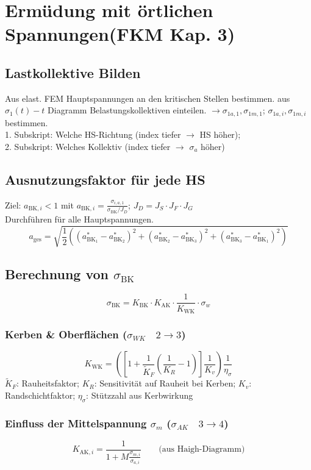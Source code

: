 \vspace{-1mm}
\section{Ermüdung mit örtlichen Spannungen(FKM Kap. 3)}
    \subsection{Lastkollektive Bilden}
    Aus elast. FEM Hauptspannungen an den kritischen Stellen bestimmen.
    aus $\sigma_1(t)-t$ Diagramm Belastungskollektiven einteilen. $\rightarrow \sigma_{1a,1}, \sigma_{1m,1}$; $\sigma_{1a,i}, \sigma_{1m,i}$ bestimmen.
    \\1. Subskript: Welche HS-Richtung (index tiefer $\rightarrow$ HS höher); 
    \\2. Subskript: Welches Kollektiv (index tiefer $\rightarrow$ $\sigma_a$ höher)
    \subsection{Ausnutzungsfaktor für jede HS}
        Ziel: $a_{\textrm{BK},i} < 1$ mit $\displaystyle a_{\textrm{BK},i} = \frac{\sigma_{i,a,1}}{\sigma_{\textrm{BK}}/J_D}$; \quad $J_D=J_S\cdot J_F \cdot J_G$ 
        \\Durchführen für alle Hauptspannungen.
        \[a_{\textrm{ges}}=\sqrt{\frac{1}{2}\left((a_{\textrm{BK}_1}^{*}-a_{\textrm{BK}_2}^{*})^{2}+(a_{\textrm{BK}_2}^{*}-a_{\textrm{BK}_3}^{*})^{2}+(a_{\textrm{BK}_3}^{*}-a_{\textrm{BK}_1}^{*})^{2}\right)}\]
    \subsection{Berechnung von $\sigma_{\textrm{BK}}$}
        \[\sigma_{\textrm{BK}} = K_{\textrm{BK}} \cdot K_{\textrm{AK}} \cdot \frac{1}{K_{\textrm{WK}}} \cdot \sigma_w \]
\columnbreak        
        \subsubsection{Kerben \& Oberflächen ($\sigma_{WK}\quad2\rightarrow3$)}
            \[K_{\textrm{WK}}=\left(\left[1+\frac{1}{\widetilde{K}_F}\left(\frac{1}{K_R}-1\right)\right]\frac{1}{K_v}\right)\frac{1}{\eta_{\sigma}}\]
            $\widetilde{K}_F$: Rauheitsfaktor;   $K_R$: Sensitivität auf Rauheit bei Kerben;     $K_v$: Randschichtfaktor;   $\eta_{\sigma}$: Stützzahl aus Kerbwirkung
        \subsubsection{Einfluss der Mittelspannung $\sigma_m$ ($\sigma_{AK}\quad3\rightarrow4$)}
            \[K_{\textrm{AK},i}=\frac{1}{1+M\frac{\sigma_{m,i}}{\sigma_{a,i}}} \qquad\textrm{(aus Haigh-Diagramm)}\]
        \vspace{-2mm}
